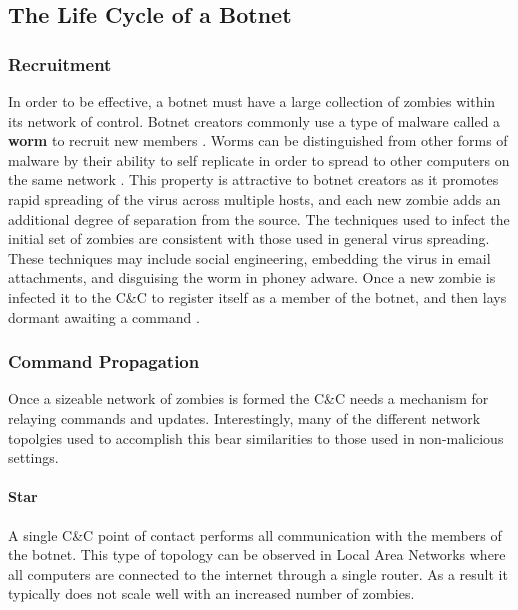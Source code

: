 \subsection{The Life Cycle of a Botnet}
\subsubsection{Recruitment}
In order to be effective, a botnet must have a large collection of zombies within its network of control.
Botnet creators commonly use a type of malware called a \textbf{worm} to recruit new members
\cite{lifecycle}.
Worms can be distinguished from other forms of malware by their ability to self replicate
in order to spread to other computers on the same network \cite{virustypes}.
This property is attractive to botnet creators as it promotes rapid spreading of the virus across
multiple hosts, and each new zombie adds an additional degree of separation from the source.
The techniques used to infect the initial set of zombies are consistent with
those used in general virus spreading.  These techniques may include social engineering,
embedding the virus in email attachments, and disguising the worm in phoney adware.
Once a new zombie is infected it  to the C\&C to register
itself as a member of the botnet, and then lays dormant awaiting a command
\cite{topology}.

\subsubsection{Command Propagation}
Once a sizeable network of zombies is formed the C\&C needs a mechanism for
relaying commands and updates. Interestingly, many of the different network topolgies
used to accomplish this bear similarities to those used in non-malicious settings.

\paragraph{Star \cite{topology}}
A single C\&C point of contact performs all communication with the members
of the botnet. This type of topology can be observed in Local Area Networks
where all computers are connected to the internet through a single router. As a
result it typically does not scale well with an increased number of zombies.

